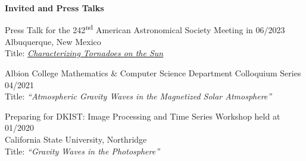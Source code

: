 \documentclass{resume} %
\begin{document}
\vspace{-0.1in}
\begin{rSection}{\textbf{Invited and Press Talks}}
\vspace{0.02in}

{Press Talk for the 242\textsuperscript{nd} American Astronomical Society Meeting in \hfill{06/2023} \\ Albuquerque, New Mexico} \\
Title: \href{https://aas.org/sites/default/files/2023-06/AAS242_Mon2_OanaVesa.pdf}{\emph{Characterizing Tornadoes on the Sun}}

{Albion College Mathematics \& Computer Science Department Colloquium Series \hfill{04/2021} \\
Title: \emph{``Atmospheric Gravity Waves in the Magnetized Solar Atmosphere''}}

{Preparing for DKIST: Image Processing and Time Series Workshop held at \hfill{01/2020} \\  California State University, Northridge  \\
Title: \emph{``Gravity Waves in the Photosphere''}}
\end{rSection}
\end{document}

